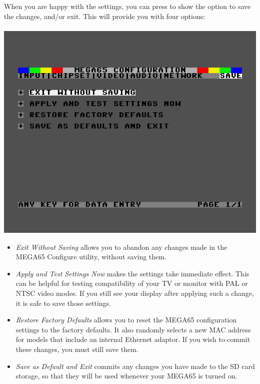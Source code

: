 \begin{minipage}{\linewidth}
  When you are happy with the settings, you can press  to show the
  option to save the changes, and/or exit. This will provide you with four options: \\
  \\
  \includegraphics[width=\linewidth]{images/ss-m65config-save.png}
\end{minipage}

\begin{itemize}
  \item{\em Exit Without Saving} allows you to abandon any changes
    made in the MEGA65 Configure utility, without saving them.
  \item{\em Apply and Test Settings Now} makes the settings take
    immediate effect.  This can be helpful for testing compatibility
    of your TV or monitor with PAL or NTSC video modes.  If you
    still see your display after applying such a change,
    it is safe to save those settings.
  \item{\em Restore Factory Defaults} allows you to reset the
    MEGA65 configuration settings to the factory defaults. It also
    randomly selects a new MAC address for models that include an
    internal Ethernet adaptor.  If you wish to commit these
    changes, you must still save them.
  \item{\em Save as Default and Exit} commits any changes you
    have made to the SD card storage, so that they will be used
    whenever your MEGA65 is turned on.
\end{itemize}

